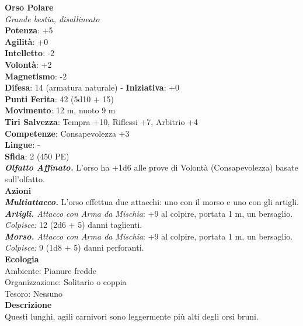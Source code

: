 \begin{multicols}{2}
\medskip\textbf{Orso Polare}\\
\emph{Grande bestia, disallineato}\\
\textbf{Potenza}: +5\\
\textbf{Agilità}: +0\\
\textbf{Intelletto}: -2\\
\textbf{Volontà}: +2\\
\textbf{Magnetismo}: -2\\
\textbf{Difesa}: 14 (armatura naturale) - \textbf{Iniziativa}: +0\\
\textbf{Punti Ferita}: 42 (5d10 + 15)\\
\textbf{Movimento}: 12 m, nuoto 9 m\\
\textbf{Tiri Salvezza}: Tempra +10, Riflessi +7, Arbitrio +4 \\
\textbf{Competenze}: Consapevolezza +3\\
\textbf{Lingue}: -\\
\textbf{Sfida}: 2 (450 PE)\smallskip\\
\emph{\textbf{Olfatto Affinato.}} L'orso ha +1d6 alle prove di Volontà (Consapevolezza) basate sull'olfatto.\\
\smallskip\textbf{Azioni}\\
\emph{\textbf{Multiattacco.}} L'orso effettua due attacchi: uno con il morso e uno con gli artigli.\\
\emph{\textbf{Artigli.} Attacco con Arma da Mischia}: +9 al colpire, portata 1 m, un bersaglio.\\
\emph{Colpisce:} 12 (2d6 + 5) danni taglienti.\\
\emph{\textbf{Morso.} Attacco con Arma da Mischia}: +9 al colpire, portata 1 m, un bersaglio.\\
\emph{Colpisce:} 9 (1d8 + 5) danni perforanti.\\
\textbf{Ecologia}\\
Ambiente: Pianure fredde\\
Organizzazione: Solitario o coppia\\
Tesoro: Nessuno\\
\textbf{Descrizione}\\

Questi lunghi, agili carnivori sono leggermente più alti degli orsi bruni. \\


\end{multicols}
